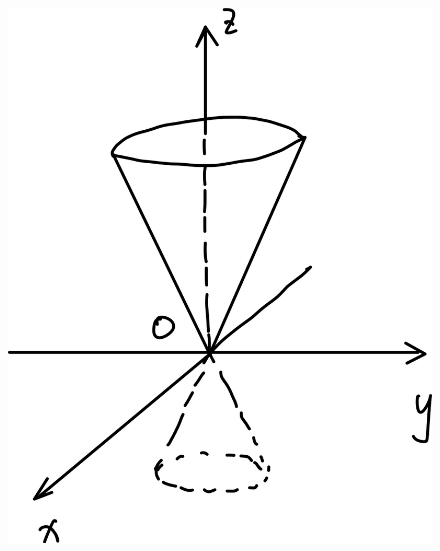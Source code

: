 \documentclass[
	11pt, %
	a4paper, %
]{WhuSakuraBook}
\begin{document}
\begin{figure}[htbp]
{\begin{minipage}[b]{.3\linewidth}
                \includegraphics[scale=0.08]{"Chapter 08 images/pic5.png"}
            \end{minipage}
        }
    \end{figure}
\end{document}
